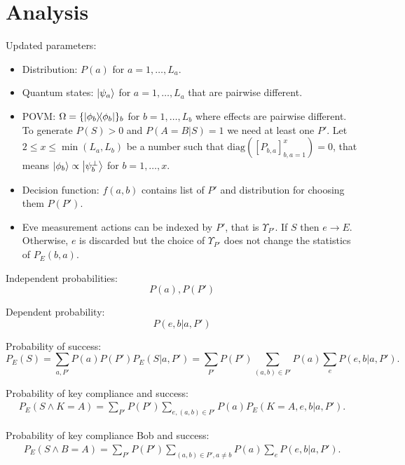 \documentclass[12pt,a4paper,reqno, aps, superscriptaddress]{amsart}
\newcommand{\proj}[1]{\ensuremath{\ketbra{#1}{#1}}}
\begin{document}
\section{Analysis}\label{sec-analysis}
Updated parameters:
\begin{itemize}
    \item Distribution: $P(a)$ for $a=1,\ldots,L_a$. 
    \item Quantum states: $ \ket{\psi_a}$ for $a=1,\ldots,L_a$ that are pairwise different.
    \item POVM: $\Omega = \{\proj{\phi_b}\}_b$ for $b=1,\ldots,L_b$ where effects are pairwise different. To generate $P(S) > 0$ and $P(A=B|S) = 1$ we need at least one $P'$. Let $2\le x\le \min(L_a,L_b)$ be a number such that $\mathrm{diag}([P_{b,a}]_{b,a=1}^x) = 0$, that means $\ket{\phi_b} \propto \ket{\psi^\perp_b}$ for $b=1,\ldots,x$.  
    \item Decision function: $f(a, b)$ contains list of $P'$ and distribution for choosing them $P(P')$.
    \item Eve measurement actions can be indexed by $P'$, that is $\Upsilon_{P'}$. If $S$ then $e \to E$. Otherwise, $e$ is discarded but the choice of $\Upsilon_{P'}$ does not change the statistics of $P_E(b,a)$.
\end{itemize}

Independent probabilities: 
\begin{equation}
    P(a), P(P')
\end{equation}

Dependent probability:
\begin{equation}
    P(e,b|a,P')
\end{equation}

Probability of success:
\begin{equation}
    P_E(S) = \sum_{a,P'} P(a)P(P') P_E(S|a,P')=\sum_{P'} P(P') \sum_{(a,b) \in P'} P(a) \sum_e P(e,b|a,P').
\end{equation}

Probability of key compliance and success:
\begin{equation}
\begin{split}
    P_E(S \wedge K=A) =\sum_{P'} P(P') \sum_{e,(a,b) \in P'} P(a) P_E(K=A,e,b|a,P').
\end{split}
\end{equation}

Probability of key compliance Bob and success:
\begin{equation}
\begin{split}
    P_E(S \wedge B=A) =\sum_{P'} P(P') \sum_{(a,b) \in P', a\neq b} P(a) \sum_e P(e,b|a,P').
\end{split}
\end{equation}
\end{document}
